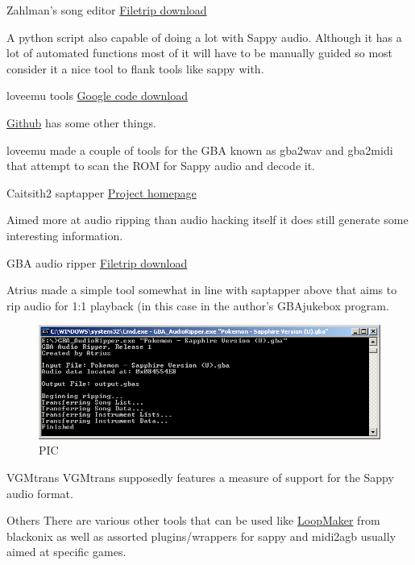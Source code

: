 \documentclass[
]{book}
\begin{document}
Zahlman's song editor \href{http://filetrip.net/gba-downloads/tools-utilities/latest-zahlman039s-song-editor-f29864.html}{Filetrip download}

A python script also capable of doing a lot with Sappy audio. Although it has a lot of automated functions most of it will have to be manually guided so most consider it a nice tool to flank tools like sappy with.

loveemu tools \href{https://code.google.com/p/loveemu/downloads/list?can=1\&q=\&colspec=Filename+Summary+Uploaded+ReleaseDate+Size+DownloadCount}{Google code download}

\href{https://github.com/loveemu}{Github} has some other things.

loveemu made a couple of tools for the GBA known as gba2wav and gba2midi that attempt to scan the ROM for Sappy audio and decode it.

Caitsith2 saptapper \href{http://gsf.caitsith2.net/ripping.html}{Project homepage}

Aimed more at audio ripping than audio hacking itself it does still generate some interesting information.

GBA audio ripper \href{http://filetrip.net/gba-downloads/tools-utilities/latest-gba-audio-ripper-f29863.html}{Filetrip download}

Atrius made a simple tool somewhat in line with saptapper above that aims to rip audio for 1:1 playback (in this case in the author's GBAjukebox program.

\begin{figure}
\centering
\includegraphics{images/166_home_fast6191_romhackingguide_unrenamed_fil___rs_romhackingguideGBAaudio_GBAaudioripper_1.png}
\caption{PIC}
\end{figure}

VGMtrans VGMtrans supposedly features a measure of support for the Sappy audio format.

Others There are various other tools that can be used like \href{http://www42.atwiki.jp/_pub/blackonix/Tools/}{LoopMaker} from blackonix as well as assorted plugins/wrappers for sappy and midi2agb usually aimed at specific games.
\end{document}
